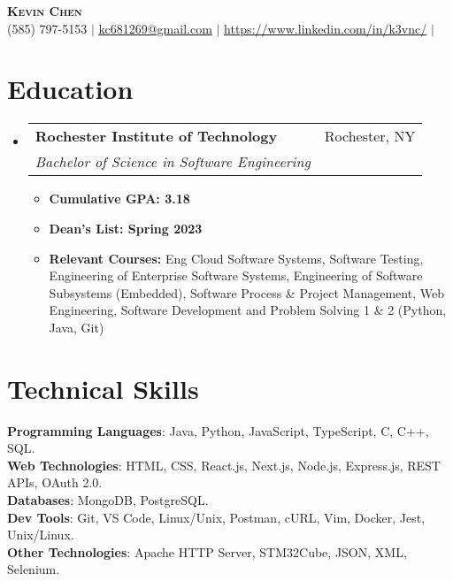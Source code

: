 \documentclass[letterpaper,11pt]{article}
\makeatletter
\newcommand{\resumeItem}[1]{
  \item\small{
    {#1 \vspace{-2pt}}
  }
}
\newcommand{\resumeSubheading}[4]{
  \vspace{-2pt}\item
    \begin{tabular*}{0.97\textwidth}[t]{l@{\extracolsep{\fill}}r}
      \textbf{#1} & #2 \\
      \textit{\small#3} & \textit{\small #4} \\
    \end{tabular*}\vspace{-7pt}
}
\newcommand{\resumeSubHeadingListStart}{\begin{itemize}[leftmargin=0.15in, label={}]}
\newcommand{\resumeSubHeadingListEnd}{\end{itemize}}
\newcommand{\resumeItemListStart}{\begin{itemize}}
\newcommand{\resumeItemListEnd}{\end{itemize}\vspace{-5pt}}
\makeatother
\begin{document}

\begin{center}
    \textbf{\Huge \scshape Kevin Chen} \\ \vspace{1pt}
    \small (585) 797-5153 $|$ \href{mailto:x@x.com}{\underline{kc681269@gmail.com}} $|$ 
    \href{https://linkedin.com/in/...}{\underline{https://www.linkedin.com/in/k3vnc/}} $|$
\end{center} 


\section{Education}
  \resumeSubHeadingListStart
    \resumeSubheading
      {Rochester Institute of Technology}{Rochester, NY}
      {Bachelor of Science in Software Engineering}{}
      \resumeItemListStart
        \resumeItem{\textbf{Cumulative GPA: 3.18}}
        \resumeItem{\textbf{Dean's List: Spring 2023}}
        \resumeItem{\textbf{Relevant Courses:} Eng Cloud Software Systems, Software Testing, Engineering of Enterprise Software Systems, Engineering of Software Subsystems (Embedded), Software Process \& Project Management, Web Engineering, Software Development and Problem Solving 1 \& 2 (Python, Java, Git)}
      \resumeItemListEnd
  \resumeSubHeadingListEnd

\section{Technical Skills}
\begin{itemize}[leftmargin=0.15in, label={}]
\small{\item{
\textbf{Programming Languages}{: Java, Python, JavaScript, TypeScript, C, C++, SQL.} \\
\textbf{Web Technologies}{: HTML, CSS, React.js, Next.js, Node.js, Express.js, REST APIs, OAuth 2.0.} \\
\textbf{Databases}{: MongoDB, PostgreSQL.} \\
\textbf{Dev Tools}{: Git, VS Code, Linux/Unix, Postman,  cURL, Vim, Docker, Jest, Unix/Linux.} \\
\textbf{Other Technologies}{: Apache HTTP Server, STM32Cube, JSON, XML, Selenium.}}}\\
\end{itemize}
\end{document}
